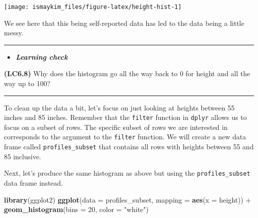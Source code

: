 \documentclass[]{tufte-book}
\newenvironment{Shaded}{\begin{snugshade}}{\end{snugshade}}
\newcommand{\KeywordTok}[1]{\textcolor[rgb]{0.13,0.29,0.53}{\textbf{{#1}}}}
\newcommand{\DataTypeTok}[1]{\textcolor[rgb]{0.13,0.29,0.53}{{#1}}}
\newcommand{\DecValTok}[1]{\textcolor[rgb]{0.00,0.00,0.81}{{#1}}}
\newcommand{\StringTok}[1]{\textcolor[rgb]{0.31,0.60,0.02}{{#1}}}
\newcommand{\NormalTok}[1]{{#1}}
\let\oldrule=\rule
\renewcommand{\rule}[1]{\oldrule{\linewidth}}
\newenvironment{rmdblock}[1]
  {\begin{shaded*}
  \begin{itemize}
  \renewcommand{\labelitemi}{
    \raisebox{-.7\height}[0pt][0pt]{
    }
  }
  \item
  }
  {
  \end{itemize}
  \end{shaded*}
  }
\newenvironment{learncheck}
  {\begin{rmdblock}{warning}}
  {\end{rmdblock}}
\begin{document}
\begin{center}\texttt{[image: ismaykim\_files/figure-latex/height-hist-1]} \end{center}

We see here that this being self-reported data has led to the data being
a little messy.

\begin{center}\rule{0.5\linewidth}{\linethickness}\end{center}

\begin{learncheck}
\textbf{\emph{Learning check}}
\end{learncheck}

\textbf{(LC6.8)} Why does the histogram go all the way back to 0 for
height and all the way up to 100?

\begin{center}\rule{0.5\linewidth}{\linethickness}\end{center}

To clean up the data a bit, let's focus on just looking at heights
between 55 inches and 85 inches. Remember that the \texttt{filter}
function in \texttt{dplyr} allows us to focus on a subset of rows. The
specific subset of rows we are interested in corresponds to the argument
to the \texttt{filter} function. We will create a new data frame called
\texttt{profiles\_subset} that contains all rows with heights between 55
and 85 inclusive.

\begin{Shaded}
\end{Shaded}

Next, let's produce the same histogram as above but using the
\texttt{profiles\_subset} data frame instead.

\begin{Shaded}
\begin{Highlighting}[]
\KeywordTok{library}\NormalTok{(ggplot2)}
\KeywordTok{ggplot}\NormalTok{(}\DataTypeTok{data =} \NormalTok{profiles_subset, }\DataTypeTok{mapping =} \KeywordTok{aes}\NormalTok{(}\DataTypeTok{x =} \NormalTok{height)) +}
\StringTok{  }\KeywordTok{geom_histogram}\NormalTok{(}\DataTypeTok{bins =} \DecValTok{20}\NormalTok{, }\DataTypeTok{color =} \StringTok{"white"}\NormalTok{)}
\end{Highlighting}
\end{Shaded}
\end{document}

